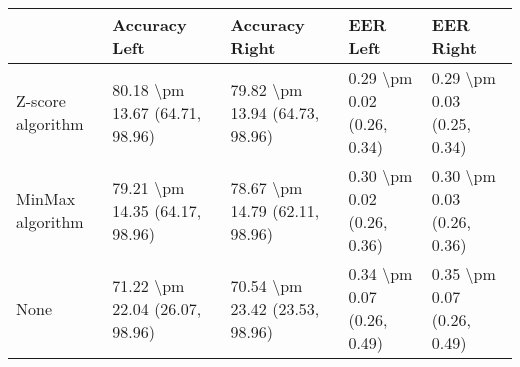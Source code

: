 \begin{tabular}{lllll}
\toprule
{} &                   Accuracy Left &                  Accuracy Right &                    EER Left &                   EER Right \\
\midrule
Z-score algorithm &  80.18 \textbackslash pm 13.67 (64.71, 98.96) &  79.82 \textbackslash pm 13.94 (64.73, 98.96) &  0.29 \textbackslash pm 0.02 (0.26, 0.34) &  0.29 \textbackslash pm 0.03 (0.25, 0.34) \\
MinMax algorithm  &  79.21 \textbackslash pm 14.35 (64.17, 98.96) &  78.67 \textbackslash pm 14.79 (62.11, 98.96) &  0.30 \textbackslash pm 0.02 (0.26, 0.36) &  0.30 \textbackslash pm 0.03 (0.26, 0.36) \\
None              &  71.22 \textbackslash pm 22.04 (26.07, 98.96) &  70.54 \textbackslash pm 23.42 (23.53, 98.96) &  0.34 \textbackslash pm 0.07 (0.26, 0.49) &  0.35 \textbackslash pm 0.07 (0.26, 0.49) \\
\bottomrule
\end{tabular}
